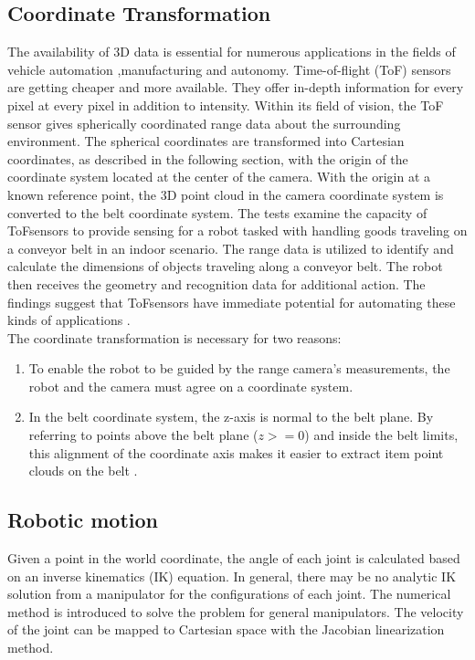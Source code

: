 \documentclass[12pt]{article}
\begin{document}
\subsection{Coordinate Transformation}
The availability of 3D data is essential for numerous applications in the fields of vehicle automation ,manufacturing and autonomy.  Time-of-flight (ToF) sensors are getting cheaper and more available. They offer in-depth information for every pixel at every pixel in addition to intensity. Within its field of vision, the ToF sensor gives spherically coordinated range data about the surrounding environment. The spherical coordinates are transformed into Cartesian coordinates, as described in the following section, with the origin of the coordinate system located at the center of the camera.  With the origin at a known reference point, the 3D point cloud in the camera coordinate system is converted to the belt coordinate system. The tests examine the capacity of ToFsensors to provide sensing for a robot tasked with handling goods traveling on a conveyor belt in an indoor scenario. The range data is utilized to identify and calculate the dimensions of objects traveling along a conveyor belt.  The robot then receives the geometry and recognition data for additional action.  The findings suggest that ToFsensors have immediate potential for automating these kinds of applications \cite{ref5}.\\

 The coordinate transformation is necessary for two reasons:\cite{ref5}
 \begin{enumerate}
     \item  To enable the robot to be guided by the range camera's measurements, the robot and the camera must agree on a coordinate system\cite{ref5}.

    \item In the belt coordinate system, the z-axis is normal to the belt plane.  By referring to points above the belt plane ($z >= 0$) and inside the belt limits, this alignment of the coordinate axis makes it easier to extract item point clouds on the belt \cite{ref5}.
 \end{enumerate}
 \subsection{Robotic motion}
Given a point in the world coordinate, the angle of each joint is calculated based on an inverse kinematics (IK) equation. In general, there may be no analytic IK solution from a manipulator for the configurations of each joint. The numerical method is introduced to solve the problem for
general manipulators. The velocity of the joint can be mapped to Cartesian space with the Jacobian linearization method\cite{ref19}.
\\
\end{document}
